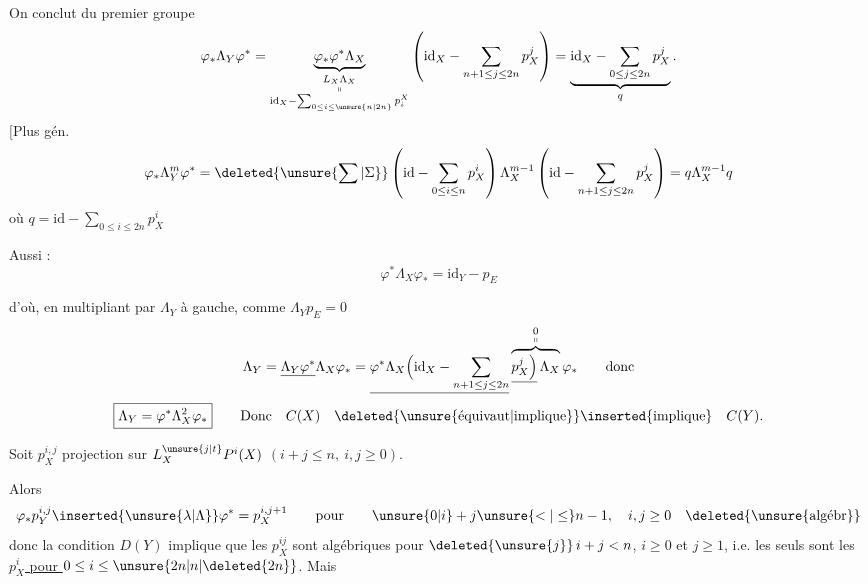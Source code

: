 On conclut du premier groupe
\[
\varphi_*\Lambda_Y\varphi^*
 =\underbrace{\varphi_*\varphi^*\Lambda_X}_{\substack{L_X\Lambda_X\\ \shortparallel\\ \mathrm{id}_X-\sum_{0\leq i\leq\unsure{n|2n}}p_i^X}}
 \left(\mathrm{id}_X-\sum_{n+1\leq j\leq2n}p_X^j\right)
 =\underbrace{\mathrm{id}_X-\sum_{0\leq j\leq2n}p_X^j}_{q}.
\]
$[$Plus gén.
\[
\varphi_*\Lambda_Y^m\varphi^*
=\deleted{\unsure{\sum|\Sigma}}\left(\mathrm{id}-\sum_{0\leq i\leq n}p_X^i\right)\Lambda_X^{m-1}
 \left(\mathrm{id}-\sum_{n+1\leq j\leq2n}p_X^j\right)=q\Lambda_X^{m-1}q
\]
où $q=\mathrm{id}-\sum_{0\leq i\leq2n}p_X^i$

Aussi :
\[
\varphi^*\Lambda_X\varphi_*=\mathrm{id}_Y-p_E
\]

d'où, en multipliant par $\Lambda_Y$ à gauche, comme $\Lambda_Yp_E=0$
\[
\Lambda_Y=\underline{\Lambda_Y\varphi^*}\Lambda_X\varphi_*=
 \underline{\varphi^*\Lambda_X\Bigl(\mathrm{id}_X-\sum_{n+1\leq j\leq2n}}
 \overbrace{\underline{p_X^j\Bigr)}\,\Lambda_X}^{\substack{0\\\shortparallel}}\varphi_*\qquad\text{donc}
\]
\[
\boxed{\Lambda_Y=\varphi^*\Lambda_X^2\varphi_*}
\qquad\text{Donc}\quad C(X)\quad\text{\deleted{\unsure{équivaut|implique}}\inserted{implique}}\quad C(Y).
\]

Soit $p_X^{i,j}$  projection sur $L_X^{\unsure{j|t}}P^i(X)$ \quad $(i+j\leq n,\ i,j\geq0)$.

Alors
\[
\varphi_*p_Y^{i,j}\inserted{\unsure{\lambda|\Lambda}}\varphi^*=p_X^{i,j+1}
 \qquad\text{pour}\qquad \unsure{0|i}+j\unsure{<|\leq}n-1,\quad i,j\geq0\quad\deleted{\unsure{\text{algébr}}}
\]
donc la condition $D(Y)$ implique que les $p_X^{ij}$ sont algébriques pour $\deleted{\unsure{j}}\,i+j<n$, $i\geq0$ et \uline{$j\geq1$}, i.e. les seuls  sont les \uline{$p_X^i$ pour $0\leq i\leq\unsure{2n|n|\deleted{2n}}$}. Mais

